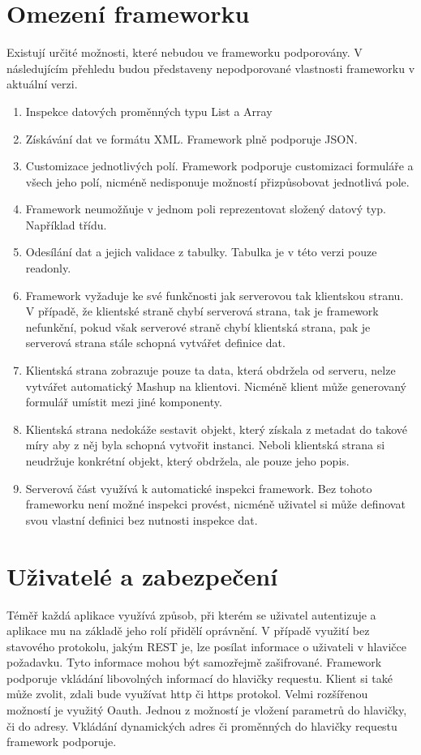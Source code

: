 \section{Omezení frameworku}
Existují určité možnosti, které nebudou ve frameworku podporovány. V následujícím přehledu budou představeny nepodporované vlastnosti frameworku v aktuální verzi.
\begin{enumerate}
\item Inspekce datových proměnných typu List a Array
\item Získávání dat ve formátu XML. Framework plně podporuje JSON.
\item Customizace jednotlivých polí. Framework podporuje customizaci formuláře a všech jeho polí, nicméně nedisponuje možností přizpůsobovat jednotlivá pole.
\item Framework neumožňuje v jednom poli reprezentovat složený datový typ. Například třídu.
\item Odesílání dat a jejich validace z tabulky. Tabulka je v této verzi pouze readonly.
\item Framework vyžaduje ke své funkčnosti jak serverovou tak klientskou stranu. V případě, že klientské straně chybí serverová strana, tak je framework nefunkční, pokud však serverové straně chybí klientská strana, pak je serverová strana stále schopná vytvářet definice dat.
\item Klientská strana zobrazuje pouze ta data, která obdržela od serveru, nelze vytvářet automatický Mashup na klientovi. Nicméně klient může generovaný formulář umístit mezi jiné komponenty.
\item Klientská strana nedokáže sestavit objekt, který získala z metadat do takové míry aby z něj byla schopná vytvořit instanci. Neboli klientská strana si neudržuje konkrétní objekt, který obdržela, ale pouze jeho popis.
\item Serverová část využívá k automatické inspekci framework. Bez tohoto frameworku není možné inspekci provést, nicméně uživatel si může definovat svou vlastní definici bez nutnosti inspekce dat.
\end{enumerate}

\section{Uživatelé a zabezpečení}
Téměř každá aplikace využívá způsob, při kterém se uživatel autentizuje a aplikace mu na základě jeho rolí přidělí oprávnění. V případě využití bez stavového protokolu, jakým REST je, lze posílat informace o uživateli v hlavičce požadavku. Tyto informace mohou být samozřejmě zašifrované. Framework podporuje vkládání libovolných informací do hlavičky requestu. Klient si také může zvolit, zdali bude využívat http či https protokol. Velmi rozšířenou možností je využitý Oauth. Jednou z možností je vložení parametrů do hlavičky, či do adresy. Vkládání dynamických adres či proměnných do hlavičky requestu framework podporuje. 


